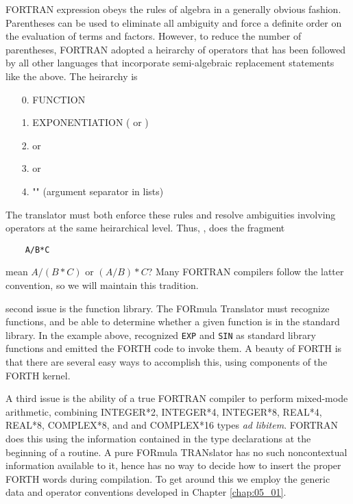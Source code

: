  FORTRAN expression obeys the rules of algebra in a generally obvious fashion. Parentheses can be used to eliminate all ambiguity and force a definite order on the evaluation of terms and factors. However, to reduce the number of parentheses, FORTRAN adopted a heirarchy of operators that has been followed by all other languages that incorporate semi-algebraic replacement statements like the above. The heirarchy is

\begin{enumerate}
    \item[0.] FUNCTION
    \item[1.] EXPONENTIATION ( \bc{^} or \bc{**})
    \item[2.] \bc{*} or \bc{/}
    \item[3.] \bc{+} or \bc{-}
    \item[4.] "\bc{,}" (argument separator in lists)
\end{enumerate}

The translator must both enforce these rules and resolve ambiguities involving operators at the same heirarchical level. Thus, \eg, does the fragment

\begin{lstlisting}
    A/B*C
\end{lstlisting}

mean $A/(B*C)$ or $(A/B)*C$? Many FORTRAN compilers follow the latter convention, so we will maintain this tradition.

 second issue is the function library. The FORmula Translator must recognize functions, and be able to determine whether a given function is in the standard library. In the example above,  recognized \texttt{EXP} and \texttt{SIN} as standard library functions and emitted the FORTH code to invoke them. A beauty of FORTH is that there are several easy ways to accomplish this, using components of the FORTH kernel.

A third issue is the ability of a true FORTRAN compiler to perform mixed-mode arithmetic, combining INTEGER*2, INTEGER*4, INTEGER*8, REAL*4, REAL*8, COMPLEX*8, and 
and COMPLEX*16 types \textit{ad libitem}. FORTRAN does this using the information contained in the type declarations at the beginning of a routine. A pure FORmula TRANslator has no such noncontextual information available to it, hence has no way to decide how to insert the proper FORTH words during compilation. To get around this we employ the generic data and operator conventions developed in Chapter \ref{chap:05_01}.

